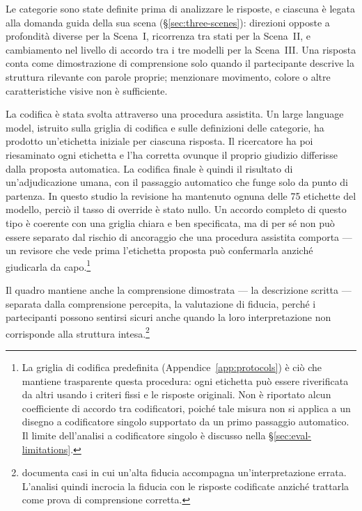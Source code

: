 Le categorie sono state definite prima di analizzare le risposte, e ciascuna è legata alla domanda guida della sua scena (\S\ref{sec:three-scenes}): direzioni opposte a profondità diverse per la Scena~I, ricorrenza tra stati per la Scena~II, e cambiamento nel livello di accordo tra i tre modelli per la Scena~III. Una risposta conta come dimostrazione di comprensione solo quando il partecipante descrive la struttura rilevante con parole proprie; menzionare movimento, colore o altre caratteristiche visive non è sufficiente.

La codifica è stata svolta attraverso una procedura assistita. Un large language model, istruito sulla griglia di codifica e sulle definizioni delle categorie, ha prodotto un'etichetta iniziale per ciascuna risposta. Il ricercatore ha poi riesaminato ogni etichetta e l'ha corretta ovunque il proprio giudizio differisse dalla proposta automatica. La codifica finale è quindi il risultato di un'adjudicazione umana, con il passaggio automatico che funge solo da punto di partenza. In questo studio la revisione ha mantenuto ognuna delle 75 etichette del modello, perciò il tasso di override è stato nullo. Un accordo completo di questo tipo è coerente con una griglia chiara e ben specificata, ma di per sé non può essere separato dal rischio di ancoraggio che una procedura assistita comporta --- un revisore che vede prima l'etichetta proposta può confermarla anziché giudicarla da capo.\footnote{La griglia di codifica predefinita (Appendice~\ref{app:protocols}) è ciò che mantiene trasparente questa procedura: ogni etichetta può essere riverificata da altri usando i criteri fissi e le risposte originali. Non è riportato alcun coefficiente di accordo tra codificatori, poiché tale misura non si applica a un disegno a codificatore singolo supportato da un primo passaggio automatico. Il limite dell'analisi a codificatore singolo è discusso nella \S\ref{sec:eval-limitations}.}

Il quadro mantiene anche la comprensione dimostrata --- la descrizione scritta --- separata dalla comprensione percepita, la valutazione di fiducia, perché i partecipanti possono sentirsi sicuri anche quando la loro interpretazione non corrisponde alla struttura intesa.\footnote{\textcite{fischer2020} documenta casi in cui un'alta fiducia accompagna un'interpretazione errata. L'analisi quindi incrocia la fiducia con le risposte codificate anziché trattarla come prova di comprensione corretta.}

